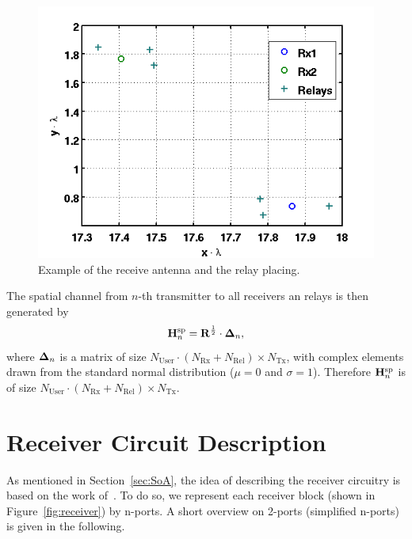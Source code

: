\begin{figure}[h]
\begin{center}
\includegraphics[width=\textwidth]{images/antennae_position.png}
\caption{Example of the receive antenna and the relay placing.}
\label{fig:antenna_placing}
\end{center}
\end{figure}

The spatial channel from $n$-th transmitter to all receivers an relays is then generated by
\begin{equation}
\label{eq:spatial_channel}
\mathbf{H}_{n}^{\text{sp}} = \mathbf{R}^{\frac{1}{2}}\cdot\mathbf{\Delta}_n,
\end{equation} 
where $\mathbf{\Delta}_n$ is a matrix of size $N_{\text{User}}\cdot \left(N_\text{Rx} + N_\text{Rel}\right) \times N_\text{Tx}$, with complex elements drawn from the standard normal distribution ($\mu = 0$ and $\sigma = 1$).
Therefore $\mathbf{H}_{n}^{\text{sp}}$ is of size $N_{\text{User}}\cdot \left(N_\text{Rx} + N_\text{Rel}\right) \times N_\text{Tx}$.


\section{Receiver Circuit Description}
\label{sec:network_description}
As mentioned in Section~\ref{sec:SoA}, the idea of describing the receiver circuitry is based on the work of~\cite{Nossek}.
To do so, we represent each receiver block (shown in Figure~\ref{fig:receiver}) by n-ports.
A short overview on 2-ports (simplified n-ports) is given in the following.

